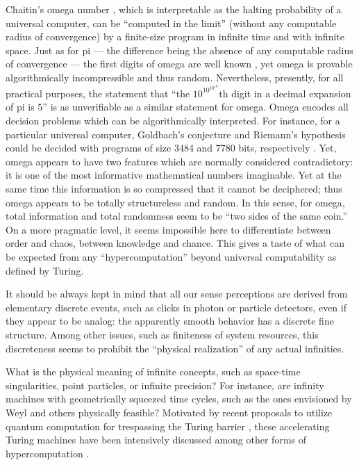 \documentclass[12pt]{article}
\begin{document}
Chaitin's omega number \cite{chaitin3}, which is
interpretable as the halting probability of a universal computer,
can be ``computed in the limit'' (without any computable radius of convergence)
by a finite-size program in infinite time and with infinite space.
Just as for pi --- the difference being the absence of any computable radius of convergence --- the first digits of omega are well known
\cite{calude-dinneen06}, yet
omega is provable algorithmically incompressible and thus random.
Nevertheless, presently, for all practical purposes, the statement that
``the $10^{10^{10^{10}}}$th digit in a decimal expansion of pi is $5$''
is as unverifiable as a similar statement for omega.
Omega encodes all decision problems which can be algorithmically interpreted.
For instance, for a particular universal computer,
Goldbach's conjecture and Riemann's hypothesis could be decided with programs of size 3484 and 7780 bits,
respectively \cite{calude-elena-dinneen06}.
Yet, omega  appears to have two features which are normally considered contradictory:
it is one of the most informative mathematical numbers imaginable.
Yet at the same time this information is so compressed that it cannot be deciphered;
thus omega appears to be totally structureless and random.
In this sense, for omega,  total information and total randomness seem to be ``two sides of the same coin.''
On a more pragmatic level, it seems impossible here to differentiate between order and chaos,
between knowledge and chance.
This gives a taste of what can be expected from any ``hypercomputation''
beyond universal computability as defined by Turing.


It should be always kept in mind that all our sense perceptions are derived from elementary discrete events,
such as clicks in photon or particle detectors, even if they appear to be
analog:
the apparently smooth behavior has a discrete  fine structure.
Among other issues, such as finiteness of system resources,
this discreteness seems to prohibit the ``physical realization'' of any actual infinities.

What is the physical meaning of infinite  concepts,
such as space-time singularities, point particles, or infinite precision?
For instance, are infinity machines with geometrically squeezed time cycles,
such as the ones envisioned by Weyl \cite{weyl:49}
and others \cite{gruenbaum:74,thom:54,benna:62,rucker,pit:90,ear-nor:93,hogarth1,hogarth2,beth-59,le-91,sv-aut-rev}
physically feasible?
Motivated by recent proposals to utilize quantum computation for trespassing the Turing barrier
\cite{2002-cal-pav,ad-ca-pa,kieu-02,kieu-02a},
these accelerating Turing machines have been intensively discussed \cite{ord-2006}
among other forms of hypercomputation \cite{Davis-2004,Doria-2006,Davis-2006}.
\end{document}
